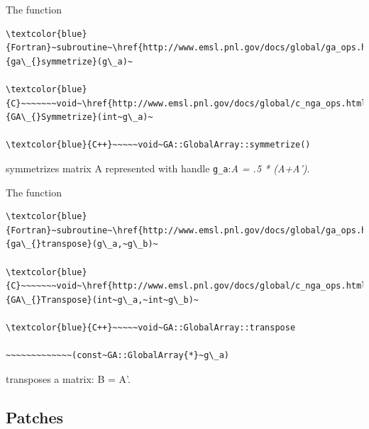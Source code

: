 The function
\begin{verbatim}
\textcolor{blue}{Fortran}~subroutine~\href{http://www.emsl.pnl.gov/docs/global/ga_ops.html\#ga_symmetrize}{ga\_{}symmetrize}(g\_a)~

\textcolor{blue}{C}~~~~~~~void~\href{http://www.emsl.pnl.gov/docs/global/c_nga_ops.html\#ga_symmetrize}{GA\_{}Symmetrize}(int~g\_a)~

\textcolor{blue}{C++}~~~~~void~GA::GlobalArray::symmetrize()
\end{verbatim}
symmetrizes matrix A represented with handle \texttt{g\_a}:\emph{A
= .5 {*} (A+A')}.

The function
\begin{verbatim}
\textcolor{blue}{Fortran}~subroutine~\href{http://www.emsl.pnl.gov/docs/global/ga_ops.html\#ga_transpose}{ga\_{}transpose}(g\_a,~g\_b)~

\textcolor{blue}{C}~~~~~~~void~\href{http://www.emsl.pnl.gov/docs/global/c_nga_ops.html\#ga_transpose}{GA\_{}Transpose}(int~g\_a,~int~g\_b)~

\textcolor{blue}{C++}~~~~~void~GA::GlobalArray::transpose

~~~~~~~~~~~~~(const~GA::GlobalArray{*}~g\_a)
\end{verbatim}
transposes a matrix: B = A'.


\subsection{Patches }

